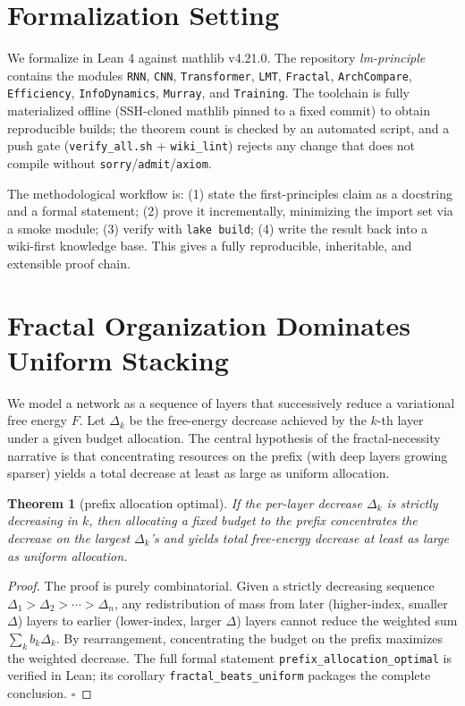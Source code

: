 \documentclass[conference]{IEEEtran}
\newtheorem{theorem}{Theorem}
\begin{document}
\section{Formalization Setting}
\label{sec:setting}
We formalize in Lean 4 \cite{lean4} against mathlib v4.21.0. The repository
\emph{lm-principle} contains the modules \texttt{RNN}, \texttt{CNN},
\texttt{Transformer}, \texttt{LMT}, \texttt{Fractal}, \texttt{ArchCompare},
\texttt{Efficiency}, \texttt{InfoDynamics}, \texttt{Murray}, and
\texttt{Training}. The toolchain is fully materialized offline (SSH-cloned
mathlib pinned to a fixed commit) to obtain reproducible builds; the theorem
count is checked by an automated script, and a push gate
(\texttt{verify\_all.sh} + \texttt{wiki\_lint}) rejects any change that does not
compile without \texttt{sorry}/\texttt{admit}/\texttt{axiom}.

The methodological workflow is: (1) state the first-principles claim as a
docstring and a formal statement; (2) prove it incrementally, minimizing the
import set via a smoke module; (3) verify with \texttt{lake build}; (4) write
the result back into a wiki-first knowledge base. This gives a fully
reproducible, inheritable, and extensible proof chain.

\section{Fractal Organization Dominates Uniform Stacking}
\label{sec:fractal}
We model a network as a sequence of layers that successively reduce a
variational free energy $F$. Let $\Delta_k$ be the free-energy decrease
achieved by the $k$-th layer under a given budget allocation. The central
hypothesis of the fractal-necessity narrative is that concentrating resources on
the prefix (with deep layers growing sparser) yields a total decrease at least
as large as uniform allocation.

\begin{theorem}[prefix allocation optimal]
\label{thm:prefix}
If the per-layer decrease $\Delta_k$ is strictly decreasing in $k$, then
allocating a fixed budget to the prefix concentrates the decrease on the
largest $\Delta_k$'s and yields total free-energy decrease at least as large as
uniform allocation.
\end{theorem}

\begin{proof}
The proof is purely combinatorial. Given a strictly decreasing sequence
$\Delta_1>\Delta_2>\cdots>\Delta_n$, any redistribution of mass from later
(higher-index, smaller $\Delta$) layers to earlier (lower-index, larger
$\Delta$) layers cannot reduce the weighted sum $\sum_k b_k\Delta_k$. By
rearrangement, concentrating the budget on the prefix maximizes the weighted
decrease. The full formal statement
\texttt{prefix\_allocation\_optimal} is verified in Lean; its corollary
\texttt{fractal\_beats\_uniform} packages the complete conclusion. \hfill$\square$
\end{proof}
\end{document}
